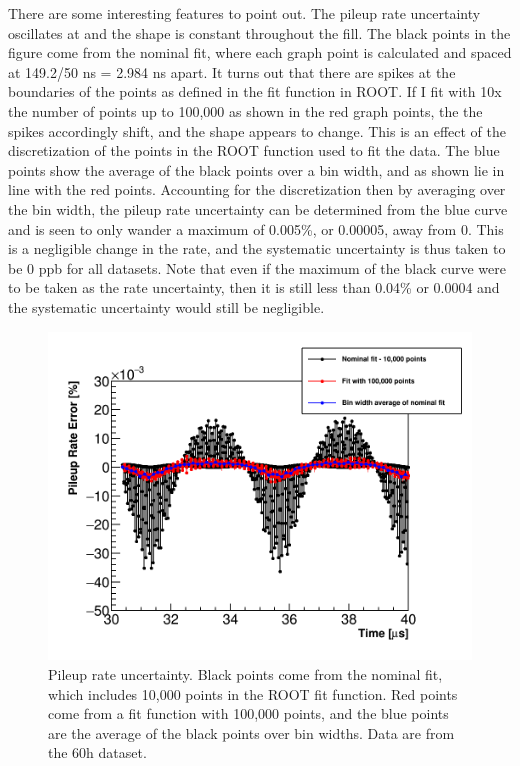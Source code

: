 There are some interesting features to point out. The pileup rate uncertainty oscillates at \wa and the shape is constant throughout the fill. The black points in the figure come from the nominal fit, where each graph point is calculated and spaced at 149.2/50 ns = 2.984 ns apart. It turns out that there are spikes at the boundaries of the points as defined in the fit function in ROOT. If I fit with 10x the number of points up to 100,000 as shown in the red graph points, the the spikes accordingly shift, and the shape appears to change. This is an effect of the discretization of the points in the ROOT function used to fit the data. The blue points show the average of the black points over a bin width, and as shown lie in line with the red points. Accounting for the discretization then by averaging over the bin width, the pileup rate uncertainty can be determined from the blue curve and is seen to only wander a maximum of 0.005\%, or 0.00005, away from 0. This is a negligible change in the rate, and the systematic uncertainty is thus taken to be 0 ppb for all datasets. Note that even if the maximum of the black curve were to be taken as the rate uncertainty, then it is still less than 0.04\% or 0.0004 and the systematic uncertainty would still be negligible.


\begin{figure}
    \centering
    \includegraphics[width=.8\textwidth]{PileupRateError}
    \caption[]{Pileup rate uncertainty. Black points come from the nominal fit, which includes 10,000 points in the ROOT fit function. Red points come from a fit function with 100,000 points, and the blue points are the average of the black points over bin widths. Data are from the 60h dataset.}
    \label{fig:pileupRateError}
\end{figure}

